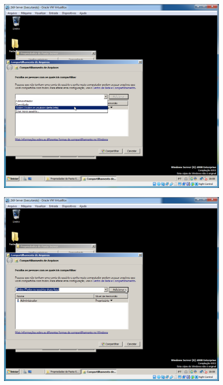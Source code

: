 \documentclass[10pt]{article}
\begin{document}
\begin{figure}[H]
    \centering
    \caption{}
    \label{fig:5115}
    \includegraphics[width=\linewidth]{images/windows_server/compartilhamento/006.png}
\end{figure}
\begin{figure}[H]
    \centering
    \caption{}
    \label{fig:5116}
    \includegraphics[width=\linewidth]{images/windows_server/compartilhamento/007.png}
\end{figure}
\end{document}
